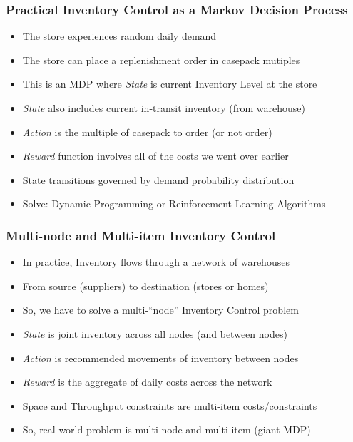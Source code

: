 \documentclass[handout]{beamer}
\begin{document}
\begin{frame}
\frametitle{Practical Inventory Control as a Markov Decision Process}
\pause
\begin{itemize}[<+->]
\item The store experiences random daily demand
\item The store can place a replenishment order in casepack mutiples
\item This is an MDP where {\em State} is current Inventory Level at the store
\item {\em State} also includes current in-transit inventory (from warehouse)
\item {\em Action} is the multiple of casepack to order (or not order)
\item {\em Reward} function involves all of the costs we went over earlier
\item State transitions governed by demand probability distribution
\item Solve: Dynamic Programming or Reinforcement Learning Algorithms
\end{itemize}
\end{frame}



\begin{frame}
\frametitle{Multi-node and Multi-item Inventory Control}
\pause
\begin{itemize}[<+->]
\item In practice, Inventory flows through a network of warehouses
\item From source (suppliers) to destination (stores or homes)
\item So, we have to solve a multi-``node'' Inventory Control problem
\item {\em State} is joint inventory across all nodes (and between nodes)
\item {\em Action} is recommended movements of inventory between nodes
\item {\em Reward} is the aggregate of daily costs across the network
\item Space and Throughput constraints are multi-item costs/constraints
\item So, real-world problem is multi-node and multi-item (giant MDP)
\end{itemize}
\end{frame}
\end{document}
